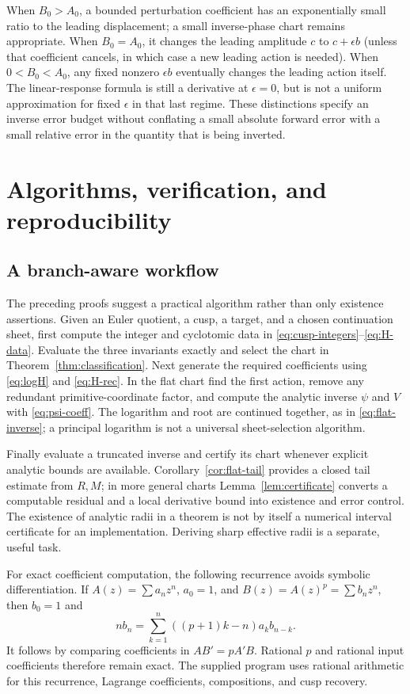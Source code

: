 \documentclass[11pt,a4paper]{article}
\numberwithin{equation}{section}
\theoremstyle{definition}\newtheorem{definition}[theorem]{Definition}
\theoremstyle{remark}\newtheorem{remark}[theorem]{Remark}
\begin{document}
When $B_0>A_0$, a bounded perturbation coefficient has an exponentially
small ratio to the leading displacement; a small inverse-phase chart
remains appropriate. When $B_0=A_0$, it changes the leading amplitude
$c$ to $c+\epsilon b$ (unless that coefficient cancels, in which case a
new leading action is needed). When $0<B_0<A_0$, any fixed nonzero
$\epsilon b$ eventually changes the leading action itself. The
linear-response formula is still a derivative at $\epsilon=0$, but is
not a uniform approximation for fixed $\epsilon$ in that last regime.
These distinctions specify an inverse error budget without conflating
a small absolute forward error with a small relative error in the
quantity that is being inverted.

\section{Algorithms, verification, and reproducibility}
\label{sec:verification}

\subsection{A branch-aware workflow}
The preceding proofs suggest a practical algorithm rather than only
existence assertions. Given an Euler quotient, a cusp, a target, and a
chosen continuation sheet, first compute the integer and cyclotomic data
in \eqref{eq:cusp-integers}--\eqref{eq:H-data}. Evaluate the three
invariants exactly and select the chart in
Theorem~\ref{thm:classification}. Next generate the required coefficients
using \eqref{eq:logH} and \eqref{eq:H-rec}. In the flat chart find the
first action, remove any redundant primitive-coordinate factor, and
compute the analytic inverse $\psi$ and $V$ with
\eqref{eq:psi-coeff}. The logarithm and root are continued together, as
in \eqref{eq:flat-inverse}; a principal logarithm is not a universal
sheet-selection algorithm.

Finally evaluate a truncated inverse and certify its chart whenever
explicit analytic bounds are available. Corollary~\ref{cor:flat-tail}
provides a closed tail estimate from $R,M$; in more general charts
Lemma~\ref{lem:certificate} converts a computable residual and a
local derivative bound into existence and error control. The existence
of analytic radii in a theorem is not by itself a numerical interval
certificate for an implementation. Deriving sharp effective radii is a
separate, useful task.

For exact coefficient computation, the following recurrence avoids
symbolic differentiation. If $A(z)=\sum a_nz^n$, $a_0=1$, and
$B(z)=A(z)^p=\sum b_nz^n$, then $b_0=1$ and
\begin{equation}\label{eq:power-rec}
 nb_n=\sum_{k=1}^n((p+1)k-n)a_kb_{n-k}.
\end{equation}
It follows by comparing coefficients in $AB'=pA'B$.
Rational $p$ and rational input coefficients therefore remain exact.
The supplied program uses rational arithmetic for this recurrence,
Lagrange coefficients, compositions, and cusp recovery.
\end{document}
